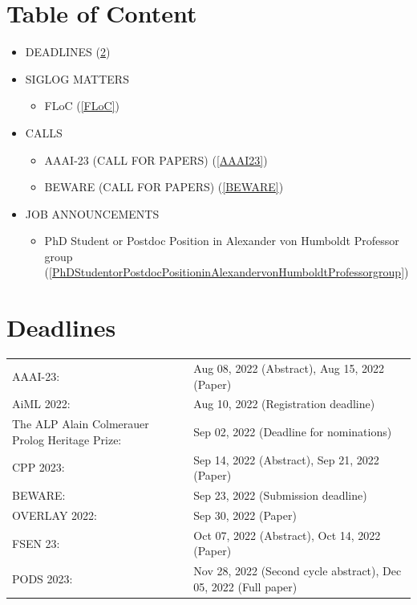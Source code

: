 \documentclass[prodmode,acmtecs]{acmsmall} %
\begin{document}
\section{Table of Content}\begin{itemize}\item DEADLINES (\cref{deadlines}) 
 
\item SIGLOG MATTERS 
 
\begin{itemize}\item FLoC (\cref{FLoC})
\end{itemize} 
\item CALLS 
 
\begin{itemize}\item AAAI-23 (CALL FOR PAPERS) (\cref{AAAI23})
\item BEWARE (CALL FOR PAPERS) (\cref{BEWARE})
\end{itemize} 
\item JOB ANNOUNCEMENTS 
 
\begin{itemize}\item PhD Student or Postdoc Position in Alexander von Humboldt Professor group (\cref{PhDStudentorPostdocPositioninAlexandervonHumboldtProfessorgroup})
\end{itemize} 
\end{itemize}\section{Deadlines}\label{deadlines}\begin{tabulary}{\linewidth}{LL}AAAI-23:  & Aug 08, 2022 (Abstract), Aug 15, 2022 (Paper) \\
AiML 2022:  & Aug 10, 2022 (Registration deadline) \\
The ALP Alain Colmerauer Prolog Heritage Prize:  & Sep 02, 2022 (Deadline for nominations) \\
CPP 2023:  & Sep 14, 2022 (Abstract), Sep 21, 2022 (Paper) \\
BEWARE:  & Sep 23, 2022 (Submission deadline) \\
OVERLAY 2022:  & Sep 30, 2022 (Paper) \\
FSEN 23:  & Oct 07, 2022 (Abstract), Oct 14, 2022 (Paper) \\
PODS 2023:  & Nov 28, 2022 (Second cycle abstract), Dec 05, 2022 (Full paper) \\
\end{tabulary}
\end{document}
